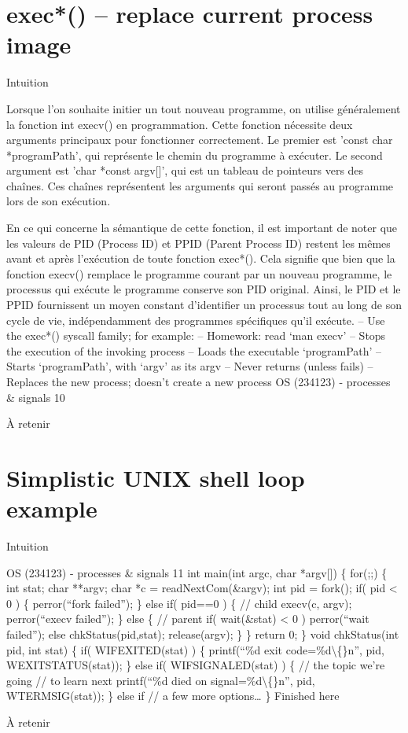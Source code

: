 \documentclass[12pt]{article}
\begin{document}
\section{exec*() – replace current process image}
\begin{myvulga}{Intuition}
\end{myvulga}
Lorsque l'on souhaite initier un tout nouveau programme, on utilise généralement la fonction int execv() en programmation. Cette fonction nécessite deux arguments principaux pour fonctionner correctement. Le premier est 'const char *programPath', qui représente le chemin du programme à exécuter. Le second argument est 'char *const argv[]', qui est un tableau de pointeurs vers des chaînes. Ces chaînes représentent les arguments qui seront passés au programme lors de son exécution.

En ce qui concerne la sémantique de cette fonction, il est important de noter que les valeurs de PID (Process ID) et PPID (Parent Process ID) restent les mêmes avant et après l'exécution de toute fonction exec*(). Cela signifie que bien que la fonction execv() remplace le programme courant par un nouveau programme, le processus qui exécute le programme conserve son PID original. Ainsi, le PID et le PPID fournissent un moyen constant d'identifier un processus tout au long de son cycle de vie, indépendamment des programmes spécifiques qu'il exécute.
– Use the exec*() syscall family; for example:
– Homework: read ‘man execv’
– Stops the execution of the invoking process
– Loads the executable ‘programPath’
– Starts ‘programPath’, with ‘argv’ as its argv
– Never returns (unless fails)
– Replaces the new process; doesn’t create a new process
OS (234123) - processes \& signals
10
\begin{aretenir}{À retenir}
\end{aretenir}

\section{Simplistic UNIX shell loop example}
\begin{myvulga}{Intuition}
\end{myvulga}
OS (234123) - processes \& signals
11
int main(int argc, char *argv[])
\{
for(;;) \{
int stat;
char **argv;
char *c = readNextCom(\&argv);
int pid = fork();
if( pid < 0 ) \{
perror(“fork failed”);
\}
else if( pid==0 ) \{ // child
execv(c, argv);
perror(“execv failed”);
\}
else \{ // parent
if( wait(\&stat) < 0 )
perror(“wait failed”);
else
chkStatus(pid,stat);
release(argv);
\}
\}
return 0;
\}
void chkStatus(int pid, int stat)
\{
if( WIFEXITED(stat) ) \{
printf(“\%d exit code=\%d\textbackslash\{\}n”,
pid, WEXITSTATUS(stat));
\}
else if( WIFSIGNALED(stat) ) \{
// the topic we’re going
// to learn next
printf(“\%d died on signal=\%d\textbackslash\{\}n”,
pid, WTERMSIG(stat));
\}
else if
// a few more options…
\}
Finished
here
\begin{aretenir}{À retenir}
\end{aretenir}
\end{document}
